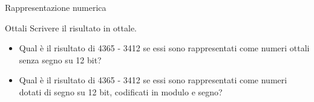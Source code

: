 \documentclass[11pt]{article}
\begin{document}
\begin{quiz}{Rappresentazione numerica}
\begin{cloze}[points=1,shuffle=false]{Ottali}
Scrivere il risultato in ottale.
\begin{itemize}
\item Qual è il risultato di 4365 - 3412 se essi sono rappresentati come numeri ottali senza segno su 12 bit? 
\item Qual è il risultato di 4365 - 3412 se essi sono rappresentati come numeri dotati di segno su 12 bit, codificati in modulo e segno? 
\end{itemize}
\end{cloze}

\end{quiz}
\end{document}
